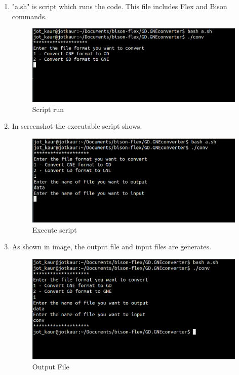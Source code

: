 \begin{enumerate}
\item "a.sh" is script which runs the code. This file includes Flex and Bison commands.
\begin{figure} [h!]
\centering
\includegraphics[scale=0.2]{images/gne1.png}
\caption{Script run}
\end{figure}

\item In screenshot the executable script shows.
\begin{figure} [h!]
\centering
\includegraphics[scale=0.2]{images/gne2.png}
\caption{Execute script}
\end{figure}

\item As shown in image, the output file and input files are generates.
\begin{figure} [h!]
\centering
\includegraphics[scale=0.2]{images/gne3.png}
\caption{ Output File}
\end{figure}


\end{enumerate}
